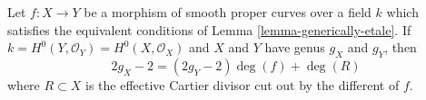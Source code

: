 \begin{lemma}
\label{lemma-rh}
Let $f : X \to Y$ be a morphism of smooth proper curves
over a field $k$ which satisfies the equivalent conditions of
Lemma \ref{lemma-generically-etale}. If
$k = H^0(Y, \mathcal{O}_Y) = H^0(X, \mathcal{O}_X)$
and $X$ and $Y$ have genus $g_X$ and $g_Y$, then
$$
2g_X - 2 = (2g_Y - 2) \deg(f) + \deg(R)
$$
where $R \subset X$ is the effective Cartier divisor cut out by
the different of $f$.
\end{lemma}
